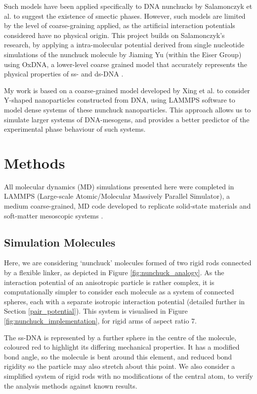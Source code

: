 \documentclass[11pt, a4paper]{article} %
\begin{document}
Such models have been applied specifically to DNA nunchucks by Salamonczyk et al. \cite{Salamonczyk2016} to suggest the existence of smectic phases. However, such models are limited by the level of coarse-graining applied, as the artificial interaction potentials considered have no physical origin. This project builds on Salamonczyk's research, by applying a intra-molecular potential derived from single nucleotide simulations of the nunchuck molecule by Jiaming Yu (within the Eiser Group) using OxDNA, a lower-level coarse grained model that accurately represents the physical properties of ss- and ds-DNA \cite{OxDNA}.

My work is based on a coarse-grained model developed by Xing et al. \cite{Xing2019} to consider Y-shaped nanoparticles constructed from DNA, using LAMMPS software\cite{LAMMPS} to model dense systems of these nunchuck nanoparticles. This approach allows us to simulate larger systems of DNA-mesogens, and provides a better predictor of the experimental phase behaviour of such systems.

\section{Methods} \label{sec:Methods}
All molecular dynamics (MD) simulations presented here were completed in LAMMPS (Large-scale Atomic/Molecular Massively Parallel Simulator), a medium coarse-grained, MD code developed to replicate solid-state materials and soft-matter mesoscopic systems \cite{Plimpton1995, LAMMPS}.


\subsection{Simulation Molecules} \label{sec:SimMolecules}
Here, we are considering `nunchuck' molecules formed of two rigid rods connected by a flexible linker, as depicted in Figure \ref{fig:nunchuck_analogy}. As the interaction potential of an anisotropic particle is rather complex, it is computationally simpler to consider each molecule as a system of connected spheres, each with a separate isotropic interaction potential (detailed further in Section \ref{pair_potential}). This system is visualised in Figure \ref{fig:nunchuck_implementation}, for rigid arms of aspect ratio 7. 

The ss-DNA is represented by a further sphere in the centre of the molecule, coloured red to highlight its differing mechanical properties. It has a modified bond angle, so the molecule is bent around this element, and reduced bond rigidity so the particle may also stretch about this point. We also consider a simplified system of rigid rods with no modifications of the central atom, to verify the analysis methods against known results.
\end{document}
